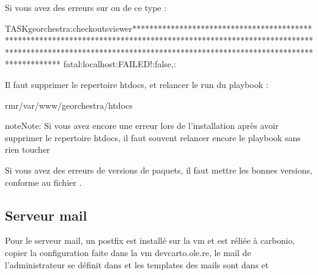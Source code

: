 \documentclass[letterpaper,10pt,french]{sphinxmanual}
\begin{document}
\sphinxAtStartPar
Si vous avez des erreurs sur  ou  de ce type :

\begin{sphinxVerbatim}[commandchars=\\\{\}]
TASK\PYG{o}{[}georchestra:checkoutsviewer\PYG{o}{]}*******************************************************************************************************************************************************************************************************
fatal:\PYG{o}{[}localhost\PYG{o}{]}:FAILED!\PYGZgt{}:false,:
\end{sphinxVerbatim}

\sphinxAtStartPar
Il faut supprimer le repertoire htdocs, et relancer le run du playbook :

\begin{sphinxVerbatim}[commandchars=\\\{\}]
rm\PYGZhy{}r/var/www/georchestra/htdocs
\end{sphinxVerbatim}

\begin{sphinxadmonition}{note}{Note:}
\sphinxAtStartPar
Si vous avez encore une erreur lors de l’installation après avoir supprimer le repertoire htdocs, il faut souvent relancer encore le playbook sans rien toucher
\end{sphinxadmonition}

\sphinxAtStartPar
Si vous avez des erreurs de versions de paquets, il faut mettre les bonnes versions, conforme au fichier .


\subsection{Serveur mail}
\label{\detokenize{doc_instal/installation:serveur-mail}}
\sphinxAtStartPar
Pour le serveur mail, un postfix est installé sur la vm et est réliée à carbonio, copier la configuration faite dans la vm dev\sphinxhyphen{}carto.ole.re,
le mail de l’administrateur se définit dans  et les templates des mails sont dans 
et 
\end{document}
